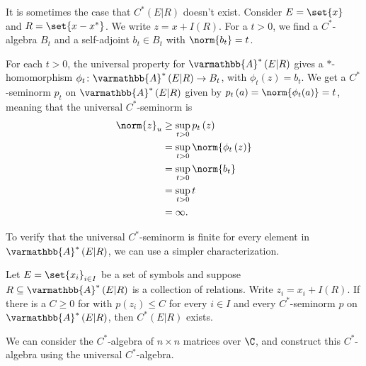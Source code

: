 \documentclass[10pt]{mypackage}
\renewcommand*{\mathbb}[1]{\varmathbb{#1}}
\newcommand{\A}{\mathbb{A}}
\begin{document}
\begin{example}
  It is sometimes the case that $C^{\ast}\left(E|R\right)$ doesn't exist. Consider $E = \set{x}$ and $R = \set{x-x^{\ast}}$. We write $z = x + I(R)$. For a $t > 0$, we find a $C^{\ast}$-algebra $B_t$ and a self-adjoint $b_t\in B_t$ with $\norm{b_t} = t$.\newline

  For each $t > 0$, the universal property for $\A^{\ast}\left(E|R\right)$ gives a $\ast$-homomorphism $\phi_t\colon \A^{\ast}\left(E|R\right)\rightarrow B_t$, with $\phi_t\left(z\right) = b_t$. We get a $C^{\ast}$-seminorm $p_t$ on $\A^{\ast}\left(E|R\right)$ given by $p_t\left(a\right)= \norm{\phi_t(a)} = t$, meaning that the universal $C^{\ast}$-seminorm is
  \begin{align*}
    \norm{z}_u &\geq \sup_{t > 0}p_t\left(z\right)\\
               &= \sup_{t > 0}\norm{\phi_t\left(z\right)}\\
               &= \sup_{t > 0}\norm{b_t}\\
               &= \sup_{t > 0}t\\
               &= \infty.
  \end{align*}
\end{example}
To verify that the universal $C^{\ast}$-seminorm is finite for every element in $\A^{\ast}\left(E|R\right)$, we can use a simpler characterization.
\begin{lemma}
  Let $E = \set{x_i}_{i\in I}$ be a set of symbols and suppose $R\subseteq \A^{\ast}\left(E|R\right)$ is a collection of relations. Write $z_i = x_i + I(R)$. If there is a $C \geq 0$ for with $p\left(z_i\right) \leq C$ for every $i\in I$ and every $C^{\ast}$-seminorm $p$ on $\A^{\ast}\left(E|R\right)$, then $C^{\ast}\left(E|R\right)$ exists.
\end{lemma}
We can consider the $C^{\ast}$-algebra of $n\times n$ matrices over $\C$, and construct this $C^{\ast}$-algebra using the universal $C^{\ast}$-algebra.
\end{document}
